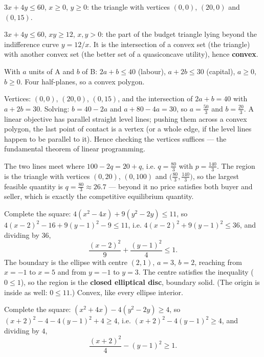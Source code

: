 \begin{solutions}
  \item $3x+4y\le60$, \;$x\ge0$, \;$y\ge0$: the triangle with vertices
        $(0,0)$, $(20,0)$ and $(0,15)$.
  \item $3x+4y\le60$, \;$xy\ge12$, \;$x,y>0$: the part of the budget
        triangle lying beyond the indifference curve $y=12/x$. It is the
        intersection of a convex set (the triangle) with another convex set
        (the better set of a quasiconcave utility), hence \textbf{convex}.
  \item With $a$ units of A and $b$ of B: $2a+b\le40$ (labour),
        $a+2b\le30$ (capital), $a\ge0$, $b\ge0$. Four half-planes, so a
        convex polygon.
  \item Vertices: $(0,0)$, $(20,0)$, $(0,15)$, and the intersection of
        $2a+b=40$ with $a+2b=30$. Solving: $b=40-2a$ and
        $a+80-4a=30$, so $a=\tfrac{50}{3}$ and $b=\tfrac{20}{3}$. A linear
        objective has parallel straight level lines; pushing them across a
        convex polygon, the last point of contact is a vertex (or a whole
        edge, if the level lines happen to be parallel to it). Hence
        checking the vertices suffices --- the fundamental theorem of
        linear programming.
  \item The two lines meet where $100-2q=20+q$, i.e. $q=\tfrac{80}{3}$ with
        $p=\tfrac{140}{3}$. The region is the triangle with vertices
        $(0,20)$, $(0,100)$ and
        $\bigl(\tfrac{80}{3},\tfrac{140}{3}\bigr)$, so the largest feasible
        quantity is $q=\tfrac{80}{3}\approx26.7$ --- beyond it no price
        satisfies both buyer and seller, which is exactly the competitive
        equilibrium quantity.
  \item Complete the square:
        $4(x^{2}-4x)+9(y^{2}-2y)\le11$, so
        $4(x-2)^{2}-16+9(y-1)^{2}-9\le11$, i.e.
        $4(x-2)^{2}+9(y-1)^{2}\le36$, and dividing by $36$,
        \[
          \frac{(x-2)^{2}}{9}+\frac{(y-1)^{2}}{4}\le1 .
        \]
        The boundary is the ellipse with centre $(2,1)$, $a=3$, $b=2$,
        reaching from $x=-1$ to $x=5$ and from $y=-1$ to $y=3$. The centre
        satisfies the inequality ($0\le1$), so the region is the
        \textbf{closed elliptical disc}, boundary solid. (The origin is
        inside as well: $0\le11$.) Convex, like every ellipse interior.
  \item Complete the square: $(x^{2}+4x)-4(y^{2}-2y)\ge4$, so
        $(x+2)^{2}-4-4(y-1)^{2}+4\ge4$, i.e.
        $(x+2)^{2}-4(y-1)^{2}\ge4$, and dividing by $4$,
        \[
          \frac{(x+2)^{2}}{4}-(y-1)^{2}\ge1 .
\]
\end{solutions}
